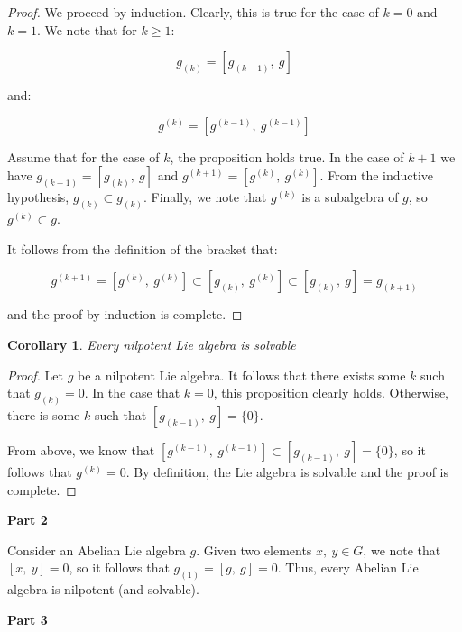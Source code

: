 \documentclass[10pt, oneside]{article}
\newtheorem{cor}{Corollary}
\begin{document}
    \begin{proof}
      We proceed by induction. Clearly, this is true for the case of $k = 0$ and $k = 1$. We note that for $k \geq 1$:

      $$g_{(k)} = [g_{(k - 1)}, \ g]$$

      and:

      $$g^{(k)} = [g^{(k - 1)}, \ g^{(k - 1)}]$$

      Assume that for the case of $k$, the proposition holds true. In the case of $k + 1$ we have $g_{(k + 1)} = [g_{(k)}, \ g]$ and
      $g^{(k + 1)} = [g^{(k)}, \ g^{(k)}]$. From the inductive hypothesis, $g_{(k)} \subset g_{(k)}$. Finally, we note that $g^{(k)}$ is a subalgebra of $g$, so $g^{(k)} \subset g$.
      \newline

      It follows from the definition of the bracket that:

      $$g^{(k + 1)} = [g^{(k)}, \ g^{(k)}] \subset [g_{(k)}, \ g^{(k)}] \subset [g_{(k)}, \ g] = g_{(k + 1)}$$

      and the proof by induction is complete.
      \end{proof}

    \begin{cor}
      Every nilpotent Lie algebra is solvable
    \end{cor}

    \begin{proof}
      Let $g$ be a nilpotent Lie algebra. It follows that there exists some $k$ such that $g_{(k)} = 0$. In the case that $k = 0$, this
      proposition clearly holds. Otherwise, there is some $k$ such that $[g_{(k - 1)}, \ g] = \{0\}$.
      \newline

      From above, we know that $[g^{(k - 1)}, \ g^{(k - 1)}] \subset [g_{(k - 1)}, \ g] = \{0\}$, so it follows that $g^{(k)} = 0$. By definition,
      the Lie algebra is solvable and the proof is complete.
    \end{proof}

    \textbf{Part 2}
    \newline

    Consider an Abelian Lie algebra $g$. Given two elements $x, \ y \in G$, we note that $[x, \ y] = 0$, so it follows that $g_{(1)} = [g, \ g] = 0$.
    Thus, every Abelian Lie algebra is nilpotent (and solvable).
    \newline

    \textbf{Part 3}
    \newline
\end{document}
